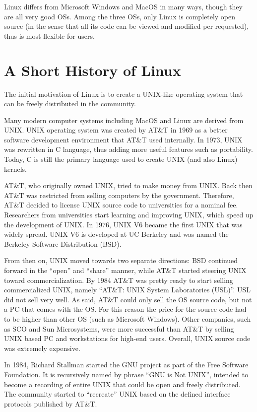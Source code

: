 Linux differs from Microsoft Windows and MacOS in many ways, though they are all very good OSs. Among the three OSs, only Linux is completely open source (in the sense that all its code can be viewed and modified per requested), thus is most flexible for users.

\section{A Short History of Linux}

The initial motivation of Linux is to create a UNIX-like operating system that can be freely distributed in the community.

Many modern computer systems including MacOS and Linux are derived from UNIX. UNIX operating system was created by AT\&T in 1969 as a better software development environment that AT\&T used internally. In 1973, UNIX was rewritten in C language, thus adding more useful features such as portability. Today, C is still the primary language used to create UNIX (and also Linux) kernels.

AT\&T, who originally owned UNIX, tried to make money from UNIX. Back then AT\&T was restricted from selling computers by the government. Therefore, AT\&T decided to license UNIX source code to universities for a nominal fee. Researchers from universities start learning and improving UNIX, which speed up the development of UNIX. In 1976, UNIX V6 became the first UNIX that was widely spread. UNIX V6 is developed at UC Berkeley and was named the Berkeley Software Distribution (BSD). 

From then on, UNIX moved towards two separate directions: BSD continued forward in the ``open'' and ``share'' manner, while AT\&T started steering UNIX toward commercialization. By 1984 AT\&T was pretty ready to start selling commercialized UNIX, namely ``AT\&T: UNIX System Laboratories (USL)''. USL did not sell very well. As said, AT\&T could only sell the OS source code, but not a PC that comes with the OS. For this reason the price for the source code had to be higher than other OS (such as Microsoft Windows). Other companies, such as SCO and Sun Microsystems, were more successful than AT\&T by selling UNIX based PC and workstations for high-end users. Overall, UNIX source code was extremely expensive.

In 1984, Richard Stallman started the GNU project as part of the Free Software Foundation. It is recursively named by phrase ``GNU is Not UNIX'', intended to become a recording of entire UNIX that could be open and freely distributed. The community started to ``recreate'' UNIX based on the defined interface protocols published by AT\&T.

